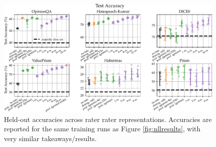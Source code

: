 \documentclass[11pt]{article}
\begin{document}
\begin{figure}[h]
\centering
\includegraphics[width=\textwidth]{files/first_acc.pdf}
\caption{Held-out accuracies across rater rater representations. Accuracies are reported for the same training runs as Figure \ref{fig:nllresults}, with very similar takeaways/results.} 
\label{fig:accresults}
\end{figure}
\end{document}
